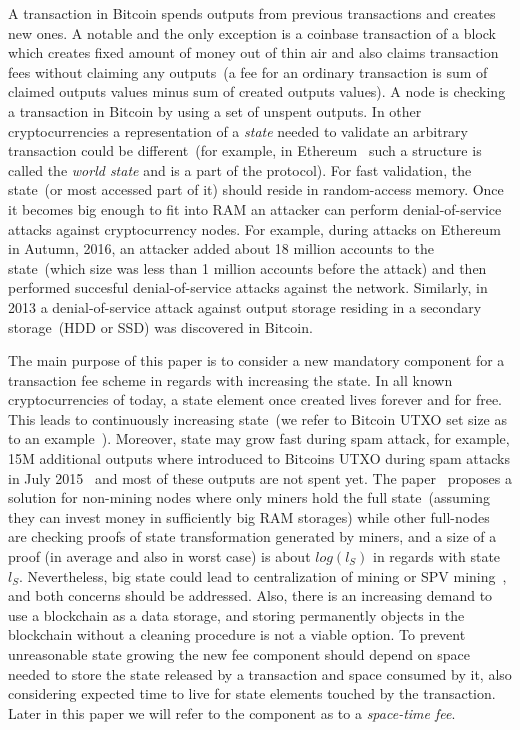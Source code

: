 \documentclass[]{article}   %
\begin{document}
A transaction in Bitcoin spends outputs from previous transactions and creates new ones. A notable and the only exception is a coinbase transaction of a block which creates fixed amount of money out of thin air and also claims transaction fees without claiming any outputs~(a fee for an ordinary transaction is sum of claimed outputs values minus sum of created outputs values). A node is checking a transaction in Bitcoin by using a set of unspent outputs. In other cryptocurrencies a representation of a \textit{state} needed to validate an arbitrary transaction could be different~(for example, in Ethereum~\cite{ethyp} such a structure is called the \textit{world state} and is a part of the protocol).  For fast validation, the state~(or most accessed part of it) should reside in random-access memory. Once it becomes big enough to fit into RAM an attacker can perform denial-of-service attacks against cryptocurrency nodes. For example, during attacks on Ethereum in Autumn, 2016, an attacker added about 18 million accounts to the state~(which size was less than 1 million accounts before the attack) and then performed succesful denial-of-service attacks against the network. Similarly, in 2013 a denial-of-service attack against output storage residing in a secondary storage~(HDD or SSD) was discovered in Bitcoin. 


The main purpose of this paper is to consider a new mandatory component for a transaction fee scheme in regards with increasing the state. In all known cryptocurrencies of today, a state element once created lives forever and for free. This leads to continuously increasing state~(we refer to Bitcoin UTXO set size as to an example~\cite{utxoChart}). Moreover, state may grow fast during spam attack, for example, 15M additional outputs where introduced to Bitcoins UTXO during spam attacks in July 2015~\cite{bitcoin2015flood} and most of these outputs are not spent yet. The paper~\cite{} proposes a solution for non-mining nodes where only miners hold the full state~(assuming they can invest money in sufficiently big RAM storages) while other full-nodes are checking proofs of state transformation generated by miners, and a size of a proof (in average and also in worst case) is about $log(l_S)$ in regards with state $l_S$. Nevertheless, big state could lead to centralization of mining or SPV mining~\cite{spvMining}, and both concerns should be addressed. 
Also, there is an increasing demand to use a blockchain as a data storage, and storing permanently objects in the blockchain without a cleaning procedure is not a viable option. To prevent unreasonable state growing the new fee component should depend on space needed to store the state released by a transaction and space consumed by it, also considering expected time to live for state elements touched by the transaction. Later in this paper we will refer to the component as to a \textit{space-time fee}.
\end{document}
